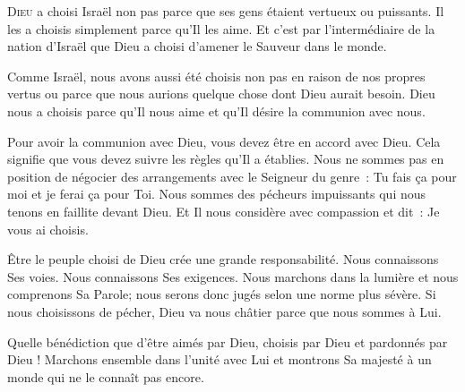 


\lettrine{D}{ieu} a choisi Israël \ocadr non pas parce que ses gens
 étaient vertueux ou puissants. Il les a choisis simplement parce
 qu'Il les aime. Et c'est par l'intermédiaire de la nation d'Israël
 que Dieu a choisi d'amener le Sauveur dans le monde. 

Comme Israël, nous avons aussi été choisis non pas en raison de nos propres
 vertus ou parce que nous aurions quelque chose dont Dieu aurait besoin.
 Dieu nous a choisis parce qu'Il nous aime et qu'Il désire
 la communion avec nous. 


Pour avoir la communion avec Dieu, vous devez être en accord avec Dieu.
 Cela signifie que vous devez suivre les règles qu'Il a établies.
 Nous ne sommes pas en position de négocier des arrangements
 avec le Seigneur du genre~:
 \Og Tu fais \c{c}a pour moi et je ferai \c{c}a pour Toi. \Fg{}
 Nous sommes des pécheurs impuissants qui nous tenons en faillite devant Dieu.
 Et Il nous considère avec compassion et dit~: 
 \Og Je vous ai choisis. \Fg{}

Être le peuple choisi de Dieu crée une grande responsabilité.
 Nous connaissons Ses voies. Nous connaissons Ses exigences.
 Nous marchons dans la lumière et nous comprenons Sa Parole;
 nous serons donc jugés selon une norme plus sévère.
 Si nous choisissons de pécher, Dieu va nous châtier
 parce que nous sommes à Lui. 

Quelle bénédiction que d'être aimés par Dieu,
 choisis par Dieu et pardonnés par Dieu !
 Marchons ensemble dans l'unité avec Lui et montrons Sa majesté
 à un monde qui ne le connaît pas encore. 

\dvrule





